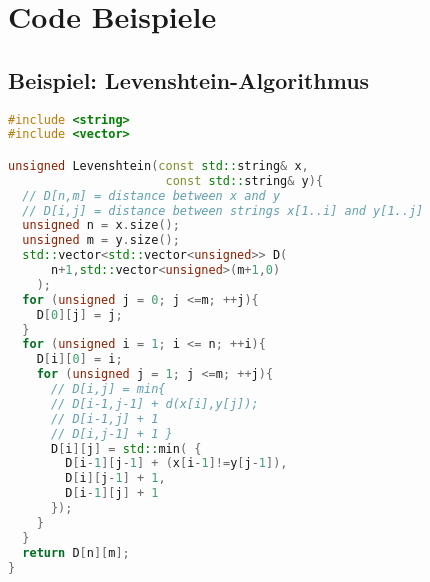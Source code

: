\section{Code Beispiele}

\subsection{Beispiel: Levenshtein-Algorithmus}
\begin{lstlisting}[language=C++]
#include <string>
#include <vector>

unsigned Levenshtein(const std::string& x, 
                      const std::string& y){
  // D[n,m] = distance between x and y
  // D[i,j] = distance between strings x[1..i] and y[1..j]
  unsigned n = x.size();
  unsigned m = y.size();
  std::vector<std::vector<unsigned>> D(
      n+1,std::vector<unsigned>(m+1,0)
    );
  for (unsigned j = 0; j <=m; ++j){
    D[0][j] = j;
  }
  for (unsigned i = 1; i <= n; ++i){
    D[i][0] = i;
    for (unsigned j = 1; j <=m; ++j){
      // D[i,j] = min{ 
      // D[i-1,j-1] + d(x[i],y[j]);
      // D[i-1,j] + 1
      // D[i,j-1] + 1 }
      D[i][j] = std::min( {
        D[i-1][j-1] + (x[i-1]!=y[j-1]), 
        D[i][j-1] + 1, 
        D[i-1][j] + 1
      });
    }
  }
  return D[n][m];
}
\end{lstlisting}

